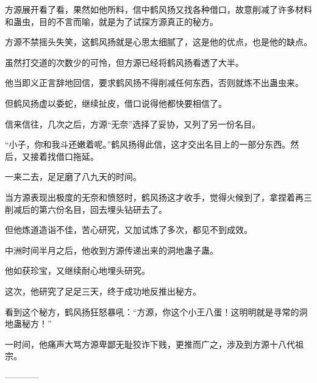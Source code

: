\begin{this_body}
方源展开看了看，果然如他所料，信中鹤风扬又找各种借口，故意削减了许多材料和蛊虫，目的不言而喻，就是为了试探方源真正的秘方。

方源不禁摇头失笑，这鹤风扬就是心思太细腻了，这是他的优点，也是他的缺点。

虽然打交道的次数少的可怜，但方源已经将鹤风扬看透了大半。

他当即义正言辞地回信，要求鹤风扬不得削减任何东西，否则就炼不出蛊虫来。

但鹤风扬虚以委蛇，继续扯皮，借口说得他都快要相信了。

信来信往，几次之后，方源“无奈”选择了妥协，又列了另一份名目。

“小子，你和我斗还嫩着呢。”鹤风扬得此信，这才交出名目上的一部分东西。然后，又接着找借口拖延。

一来二去，足足磨了八九天的时间。

当方源表现出极度的无奈和愤怒时，鹤风扬这才收手，觉得火候到了，拿捏着再三削减后的第六份名目，回去埋头钻研去了。

但他炼道造诣不佳，苦心研究，又加试炼了多次，都见不到成效。

中洲时间半月之后，他收到方源传递出来的洞地蛊子蛊。

他如获珍宝，又继续耐心地埋头研究。

这次，他研究了足足三天，终于成功地反推出秘方。

看到这个秘方，鹤风扬狂怒暴吼：“方源，你这个小王八蛋！这明明就是寻常的洞地蛊秘方！”

一时间，他痛声大骂方源卑鄙无耻狡诈下贱，更推而广之，涉及到方源十八代祖宗。

------------

\end{this_body}

